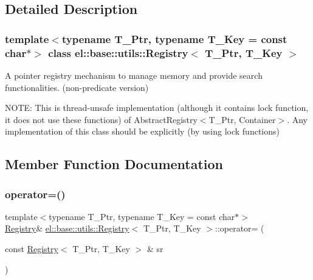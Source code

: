 \subsection{Detailed Description}
\subsubsection*{template$<$typename T\+\_\+\+Ptr, typename T\+\_\+\+Key = const char$\ast$$>$\newline
class el\+::base\+::utils\+::\+Registry$<$ T\+\_\+\+Ptr, T\+\_\+\+Key $>$}

A pointer registry mechanism to manage memory and provide search functionalities. (non-\/predicate version) 

N\+O\+TE\+: This is thread-\/unsafe implementation (although it contains lock function, it does not use these functions) of Abstract\+Registry$<$\+T\+\_\+\+Ptr, Container$>$. Any implementation of this class should be explicitly (by using lock functions) 

\subsection{Member Function Documentation}
\mbox{\label{classel_1_1base_1_1utils_1_1_registry_a80e0ce12b7d0c24462b385fc7b3149e0}} 
\subsubsection{\texorpdfstring{operator=()}{operator=()}}
{\footnotesize\ttfamily template$<$typename T\+\_\+\+Ptr, typename T\+\_\+\+Key = const char$\ast$$>$ \\
\hyperlink{classel_1_1base_1_1utils_1_1_registry}{Registry}\& \hyperlink{classel_1_1base_1_1utils_1_1_registry}{el\+::base\+::utils\+::\+Registry}$<$ T\+\_\+\+Ptr, T\+\_\+\+Key $>$\+::operator= (\begin{DoxyParamCaption}\item[{const \hyperlink{classel_1_1base_1_1utils_1_1_registry}{Registry}$<$ T\+\_\+\+Ptr, T\+\_\+\+Key $>$ \&}]{sr }\end{DoxyParamCaption})\hspace{0.3cm}{\ttfamily [inline]}}



